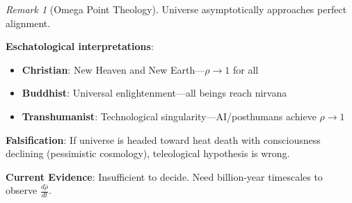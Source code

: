 \documentclass[11pt,a4paper]{article}
\theoremstyle{definition}
\theoremstyle{remark}
\newtheorem{remark}{Remark}[section]
\begin{document}
\begin{enumerate}
\begin{remark}[Omega Point Theology]
Universe asymptotically approaches perfect alignment.

\textbf{Eschatological interpretations}:
\begin{itemize}
    \item \textbf{Christian}: New Heaven and New Earth—\(\rho \to 1\) for all
    \item \textbf{Buddhist}: Universal enlightenment—all beings reach nirvana
    \item \textbf{Transhumanist}: Technological singularity—AI/posthumans achieve \(\rho \to 1\)
\end{itemize}

\textbf{Falsification}: If universe is headed toward heat death with consciousness declining (pessimistic cosmology), teleological hypothesis is wrong.

\textbf{Current Evidence}: Insufficient to decide. Need billion-year timescales to observe \(\frac{d\bar{\rho}}{dt}\).
\end{remark}

\begin{figure}[H]
\centering
{}
\end{figure}
\end{enumerate}
\end{document}
